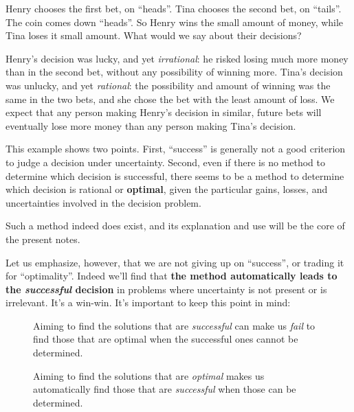 \documentclass[
  a4paper,
  DIV=11,
  numbers=noendperiod,
  oneside]{scrreprt}
\begin{document}
Henry chooses the first bet, on ``heads''. Tina chooses the second bet,
on ``tails''. The coin comes down ``heads''. So Henry wins the small
amount of money, while Tina loses it small amount. What would we say
about their decisions?

Henry's decision was lucky, and yet \emph{irrational}: he risked losing
much more money than in the second bet, without any possibility of
winning more. Tina's decision was unlucky, and yet \emph{rational}: the
possibility and amount of winning was the same in the two bets, and she
chose the bet with the least amount of loss. We expect that any person
making Henry's decision in similar, future bets will eventually lose
more money than any person making Tina's decision.

This example shows two points. First, ``success'' is generally not a
good criterion to judge a decision under uncertainty. Second, even if
there is no method to determine which decision is successful, there
seems to be a method to determine which decision is rational or
{\textbf{optimal}}, given the particular gains, losses, and
uncertainties involved in the decision problem.

Such a method indeed does exist, and its explanation and use will be the
core of the present notes.

Let us emphasize, however, that we are not giving up on ``success'', or
trading it for ``optimality''. Indeed we'll find that \textbf{the method
automatically leads to the \emph{successful} decision} in problems where
uncertainty is not present or is irrelevant. It's a win-win. It's
important to keep this point in mind:

\begin{figure}

\begin{tcolorbox}[enhanced jigsaw, titlerule=0mm, toprule=.15mm, toptitle=1mm, bottomrule=.15mm, leftrule=.75mm, title={}, arc=.35mm, breakable, left=2mm, coltitle=black, colframe=quarto-callout-note-color-frame, colbacktitle=quarto-callout-note-color!10!white, bottomtitle=1mm, rightrule=.15mm, opacitybacktitle=0.6, opacityback=0, colback=white]

{Aiming to find the solutions that are \emph{successful} can make us
\emph{fail} to find those that are optimal when the successful ones
cannot be determined.}

{Aiming to find the solutions that are \emph{optimal} makes us
automatically find those that are \emph{successful} when those can be
determined.}

\end{tcolorbox}

\end{figure}
\end{document}
